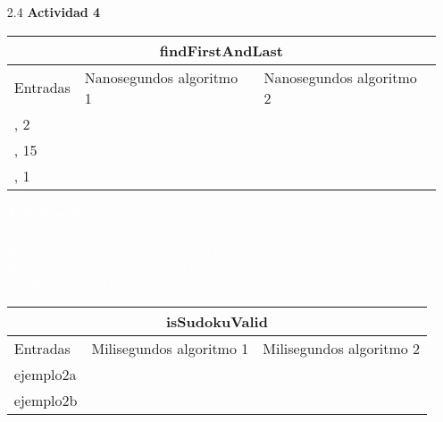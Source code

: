 \documentclass[a4paper,10pt]{article}
\begin{document}
\begin{enumerate}
    
    \item[2.4] \textbf{Actividad 4}
    \begin{table}[htb]
        \centering
        \begin{tabular}{|l|l|l|}
        \hline
        \multicolumn{3}{|c|}{findFirstAndLast} \\ \hline
        Entradas & Nanosegundos algoritmo 1 & Nanosegundos algoritmo 2 \\
        \hline \hline
        [1,4,2,1,6,2,9], 2 & \hspace{1.3cm}{$\approx 358$} & \hspace{1.3cm}{$\approx 202$} \\ \hline
        [4,2,7,5,4,3,7,2,5,3,4,1], 15 &  \hspace{1.3cm}{$\approx 329$}& \hspace{1.3cm}{$\approx 197$} \\ \hline
        [3,2,1,4,2], 1 & \hspace{1.3cm}{$\approx 280$} & \hspace{1.3cm}{$\approx 307$} \\ \hline
        \end{tabular}
        \end{table}

        \begin{tcolorbox}[colback=black!20!black,colframe=cyan!85!black]
           \textcolor{white}{ \textbf{Justificación.\\}El algoritmo 2 que se implemento consta de un solo for anidando if-else por lo que esta última estructura de control tiene una complejidad $O(1)$,
                             disminuyendo considerablemente la complejidad que se tenía al inicio,y aproximandose a $O(n/2)$.}
          \end{tcolorbox}
        
       
          \begin{table}[htb]
            \centering
            \begin{tabular}{|l|l|l|}
            \hline
            \multicolumn{3}{|c|}{isSudokuValid} \\ \hline
            Entradas & Milisegundos algoritmo 1 & Milisegundos algoritmo 2 \\
            \hline \hline
            ejemplo2a & \hspace{1.3cm}{$\approx 38$} & \hspace{1.3cm}{$\approx 9$} \\ \hline
            ejemplo2b & \hspace{1.3cm}{$\approx 33$} & \hspace{1.3cm}{$\approx 8$} \\ \hline
            \end{tabular}
            \end{table}


\end{enumerate}
\end{document}
